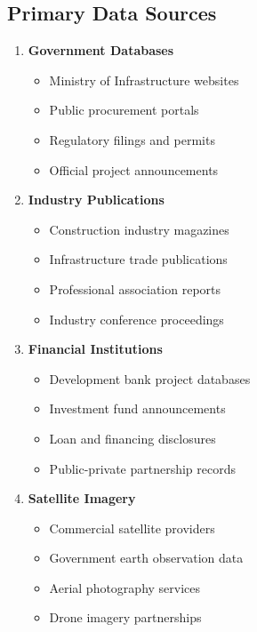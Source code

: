 \documentclass[business]{../templates/infraradar-main}
\begin{document}
\subsection{Primary Data Sources}
\begin{enumerate}
    \item \textbf{Government Databases}
    \begin{itemize}
        \item Ministry of Infrastructure websites
        \item Public procurement portals
        \item Regulatory filings and permits
        \item Official project announcements
    \end{itemize}
    
    \item \textbf{Industry Publications}
    \begin{itemize}
        \item Construction industry magazines
        \item Infrastructure trade publications
        \item Professional association reports
        \item Industry conference proceedings
    \end{itemize}
    
    \item \textbf{Financial Institutions}
    \begin{itemize}
        \item Development bank project databases
        \item Investment fund announcements
        \item Loan and financing disclosures
        \item Public-private partnership records
    \end{itemize}
    
    \item \textbf{Satellite Imagery}
    \begin{itemize}
        \item Commercial satellite providers
        \item Government earth observation data
        \item Aerial photography services
        \item Drone imagery partnerships
    \end{itemize}
\end{enumerate}
\end{document}
